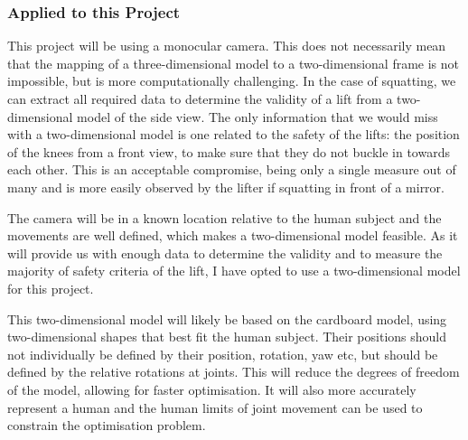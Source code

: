 \subsubsection{Applied to this Project}

This project will be using a monocular camera. This does not necessarily mean that the mapping of a three-dimensional model to a two-dimensional frame is not impossible, but is more computationally challenging. In the case of squatting, we can extract all required data to determine the validity of a lift from a two-dimensional model of the side view. The only information that we would miss with a two-dimensional model is one related to the safety of the lifts: the position of the knees from a front view, to make sure that they do not buckle in towards each other. This is an acceptable compromise, being only a single measure out of many and is more easily observed by the lifter if squatting in front of a mirror.

The camera will be in a known location relative to the human subject and the movements are well defined, which makes a two-dimensional model feasible. As it will provide us with enough data to determine the validity and to measure the majority of safety criteria of the lift, I have opted to use a two-dimensional model for this project.

This two-dimensional model will likely be based on the cardboard model, using two-dimensional shapes that best fit the human subject. Their positions should not individually be defined by their position, rotation, yaw etc, but should be defined by the relative rotations at joints. This will reduce the degrees of freedom of the model, allowing for faster optimisation. It will also more accurately represent a human and the human limits of joint movement can be used to constrain the optimisation problem.